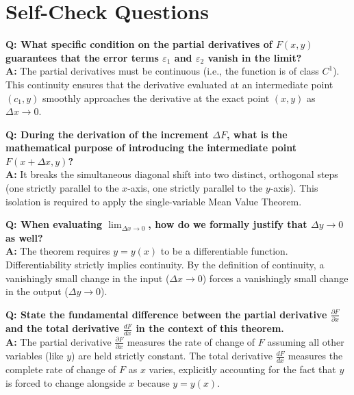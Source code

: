 \documentclass{essay}
\begin{document}
\newpage

\section{Self-Check Questions}

\textbf{Q: What specific condition on the partial derivatives of \(F(x,y)\) guarantees that the error terms \(\varepsilon_{1}\) and \(\varepsilon_{2}\) vanish in the limit?} \\
\textbf{A:} The partial derivatives must be continuous (i.e., the function is of class \(C^{1}\)). This continuity ensures that the derivative evaluated at an intermediate point \((c_{1}, y)\) smoothly approaches the derivative at the exact point \((x,y)\) as \(\Delta x \to 0\).

\vspace{1em}
\textbf{Q: During the derivation of the increment \(\Delta F\), what is the mathematical purpose of introducing the intermediate point \(F(x+\Delta x, y)\)?} \\
\textbf{A:} It breaks the simultaneous diagonal shift into two distinct, orthogonal steps (one strictly parallel to the \(x\)-axis, one strictly parallel to the \(y\)-axis). This isolation is required to apply the single-variable Mean Value Theorem.

\vspace{1em}
\textbf{Q: When evaluating \(\lim_{\Delta x \to 0}\), how do we formally justify that \(\Delta y \to 0\) as well?} \\
\textbf{A:} The theorem requires \(y = y(x)\) to be a differentiable function. Differentiability strictly implies continuity. By the definition of continuity, a vanishingly small change in the input (\(\Delta x \to 0\)) forces a vanishingly small change in the output (\(\Delta y \to 0\)).

\vspace{1em}
\textbf{Q: State the fundamental difference between the partial derivative \(\frac{\partial F}{\partial x}\) and the total derivative \(\frac{dF}{dx}\) in the context of this theorem.} \\
\textbf{A:} The partial derivative \(\frac{\partial F}{\partial x}\) measures the rate of change of \(F\) assuming all other variables (like \(y\)) are held strictly constant. The total derivative \(\frac{dF}{dx}\) measures the complete rate of change of \(F\) as \(x\) varies, explicitly accounting for the fact that \(y\) is forced to change alongside \(x\) because \(y = y(x)\).
\end{document}
